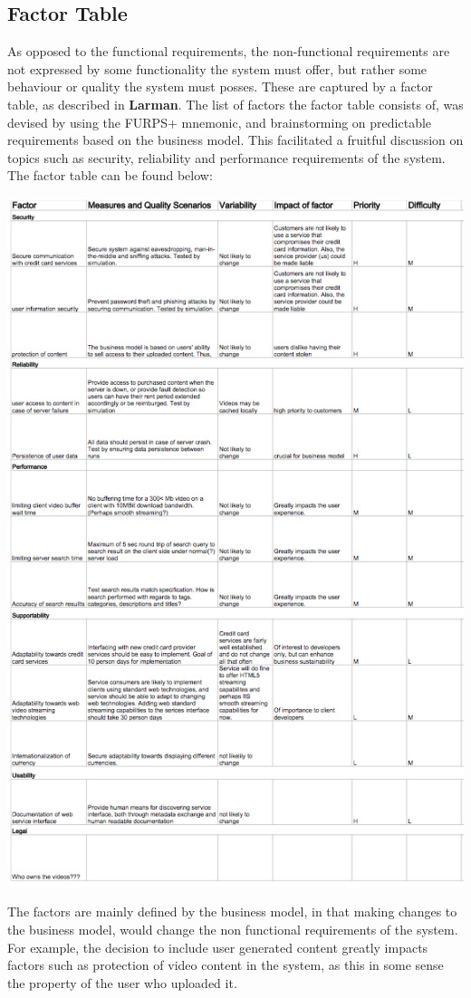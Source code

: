\subsection{Factor Table}
\label{FactorTable}
As opposed to the functional requirements, the non-functional requirements are not expressed by some functionality the system must offer, but rather some behaviour or quality the system must posses. These are captured by a factor table, as described in \textbf{Larman}. The list of factors the factor table consists of, was devised by using the FURPS+ mnemonic, and brainstorming on predictable requirements based on the business model. This facilitated a fruitful discussion on topics such as security, reliability and performance requirements of the system. The factor table can be found below:
\begin{center}
\includegraphics[scale=1.3]{FactorTable.png}
\end{center}
The factors are mainly defined by the business model, in that making changes to the business model, would change the non functional requirements of the system.  For example, the decision to include user generated content greatly impacts factors such as protection of video content in the system, as this in some sense the property of the user who uploaded it.

